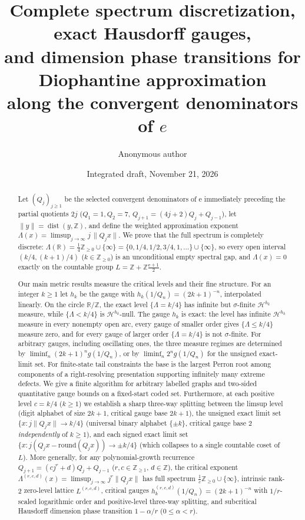 \documentclass[11pt]{article}
\title{Complete spectrum discretization, exact Hausdorff gauges,\\
and dimension phase transitions for Diophantine approximation\\
along the convergent denominators of \texorpdfstring{$e$}{e}}
\author{Anonymous author}
\date{Integrated draft, November 21, 2026}
\theoremstyle{definition}
\theoremstyle{remark}
\newcommand{\R}{\mathbb{R}}
\newcommand{\Z}{\mathbb{Z}}
\newcommand{\ee}{\mathrm{e}}
\newcommand{\dist}{\operatorname{dist}}
\newcommand{\Lam}{\Lambda}
\begin{document}
\maketitle

\begin{abstract}
Let $(Q_j)_{j\ge1}$ be the selected convergent denominators of $\ee$
immediately preceding the partial quotients $2j$
($Q_1=1,Q_2=7$, $Q_{j+1}=(4j+2)Q_j+Q_{j-1}$), let $\|y\|=\dist(y,\Z)$, and
define the weighted approximation exponent
$\Lam(x)=\limsup_{j\to\infty} j\,\|Q_j x\|$. We prove that the full spectrum is
completely discrete:
$\Lam(\R)=\frac14\Z_{\ge0}\cup\{\infty\}=\{0,1/4,1/2,3/4,1,\dots\}\cup\{\infty\}$,
so every open interval $(k/4,(k+1)/4)$ ($k\in\Z_{\ge0}$) is an unconditional
empty spectral gap, and $\Lam(x)=0$ exactly on the countable group
$L=\Z+\Z\frac{\ee+1}{2}$.

Our main metric results measure the critical levels and their fine structure.
For an integer $k\ge1$ let $h_k$ be the gauge with $h_k(1/Q_n)=(2k+1)^{-n}$,
interpolated linearly. On the circle $\R/\Z$, the exact level $\{\Lam=k/4\}$
has infinite but $\sigma$-finite $\mathcal H^{h_k}$ measure, while
$\{\Lam<k/4\}$ is $\mathcal H^{h_k}$-null. The gauge $h_k$ is exact: the level
has infinite $\mathcal H^{h_k}$ measure in every nonempty open arc, every gauge
of smaller order gives $\{\Lam\le k/4\}$ measure zero, and for every gauge of
larger order $\{\Lam=k/4\}$ is not $\sigma$-finite. For arbitrary gauges,
including oscillating ones, the three measure regimes are determined by
$\liminf_n (2k+1)^n g(1/Q_n)$, or by $\liminf_n 2^n g(1/Q_n)$ for the
unsigned exact-limit set. For finite-state tail constraints the base is
the largest Perron root among components of a right-resolving
presentation supporting infinitely many extreme defects. We give
a finite algorithm for arbitrary labelled graphs and two-sided
quantitative gauge bounds on a fixed-start coded set. Furthermore, at each
positive level $c=k/4$ ($k\ge1$) we establish a sharp three-way splitting
between the limsup level (digit alphabet of size $2k+1$, critical gauge base
$2k+1$), the unsigned exact limit set $\{x:j\|Q_jx\|\to k/4\}$ (universal binary
alphabet $\{\pm k\}$, critical gauge base $2$ \emph{independently} of
$k\ge1$), and each signed exact limit set
$\{x:j(Q_jx-\mathrm{round}(Q_jx))\to\pm k/4\}$ (which collapses to a single
countable coset of $L$). More generally, for any polynomial-growth recurrence
$Q_{j+1}=(cj^r+d)Q_j+Q_{j-1}$ ($r,c\in\Z_{\ge1}$, $d\in\Z$), the critical
exponent $\Lam^{(r,c,d)}(x)=\limsup_{j\to\infty}j^r\|Q_jx\|$ has full
spectrum $\frac1c\Z_{\ge0}\cup\{\infty\}$, intrinsic rank-$2$ zero-level
lattice $L^{(r,c,d)}$, critical gauges $h_k^{(r,c,d)}(1/Q_n)=(2k+1)^{-n}$
with $1/r$-scaled logarithmic order and positive-level three-way splitting, and
subcritical Hausdorff dimension phase transition $1-\alpha/r$ ($0\le\alpha<r$).


\end{abstract}
\end{document}
